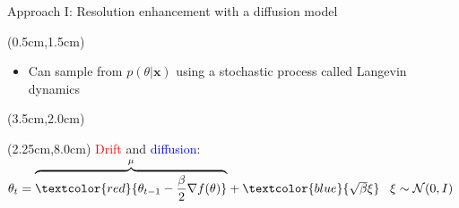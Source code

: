 \documentclass{beamer}					%
\begin{document}
\begin{frame}{Approach I: Resolution enhancement with a diffusion model}
\begin{textblock*}{13cm}(0.5cm,1.5cm)
\begin{itemize}
\item Can sample from $p(\theta\lvert \boldsymbol{x})$ using a stochastic process called Langevin dynamics
\end{itemize}
\end{textblock*}
\begin{textblock*}{8cm}(3.5cm,2.0cm)
\end{textblock*}
\begin{textblock*}{14cm}(2.25cm,8.0cm)
\textcolor{red}{Drift} and \textcolor{blue}{diffusion}: 
$\theta_{t} = 
\overset{\mu}{\overbrace{\textcolor{red}{\theta_{t-1} - \frac{\beta}{2}\nabla f(\theta)}}} 
+ \textcolor{blue}{\sqrt{\beta}\xi} 
\;\;\; \xi \sim \mathcal{N}(0,I)$
\end{textblock*}
\end{frame}

\end{document}
